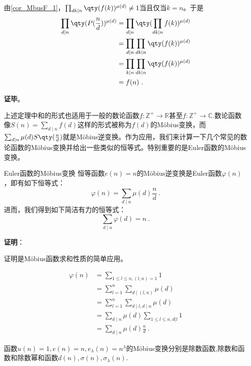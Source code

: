 由\autoref{cor_MbusF_1}，$\prod_{dk\mid n}\qty(f(k))^{\mu(d)}\neq 1$当且仅当$k=n$。于是
\begin{equation}
\begin{aligned}
\prod_{d\mid n}\qty(P(\frac{n}{d}))^{\mu(d)}&=\prod_{d\mid n}\qty(\prod_{dk\mid n}f(k))^{\mu(d)}\\
&=\prod_{d\mid n}\prod_{dk\mid n}\qty(f(k))^{\mu(d)}\\
&=\prod_{k\mid n}\prod_{dk\mid n}\qty(f(k))^{\mu(d)}\\
&=f(n)~.
\end{aligned}
\end{equation}

\textbf{证毕}。

上述定理中和的形式也适用于一般的数论函数$f:\mathbb{Z}^+\to\mathbb{R}$甚至$f:\mathbb{Z}^+\to\mathbb{C}$.数论函数像$S(n)=\sum_{d\mid n}f(d)$这样的形式被称为$f(d)$的Möbius变换，而$\sum_{d\mid n}\mu(d)S\qty(\frac{n}{d})$就是Möbius逆变换。作为应用，我们来计算一下几个常见的数论函数的Möbius变换并给出一些类似的恒等式。特别重要的是Euler函数的Möbius变换。

\begin{theorem}{Euler函数的Möbius变换}
恒等函数$e(n)=n$的Möbius逆变换是Euler函数$\varphi(n)$，即有如下恒等式：
\begin{equation}
\varphi(n) = \sum_{d\mid n}\mu(d)\frac{n}{d}~.
\end{equation}
进而，我们得到如下简洁有力的恒等式：
\begin{equation}
\sum_{d\mid n}\varphi(d) = n~.
\end{equation}
\end{theorem}

\textbf{证明}：

证明是Möbius函数求和性质的简单应用。

\begin{equation}
\begin{aligned}
\varphi(n)&=\sum_{1\leq l\leq n,(l,n)=1}1\\
&=\sum_{l=1}^n\sum_{d\mid(l,n)}\mu(d)\\
&=\sum_{l=1}^n\sum_{d\mid l,d\mid n}\mu(d)\\
&=\sum_{d\mid n}\mu(d)\sum_{1\leq l\leq n,d|l}1\\
&=\sum_{d\mid n}\mu(d)\frac{n}{d}~.
\end{aligned}
\end{equation}

\begin{theorem}{}
函数$u(n)=1,e(n)=n,e_\lambda(n)=n^\lambda$的Möbius变换分别是除数函数,除数和函数和除数幂和函数$d(n),\sigma(n),\sigma_\lambda(n)$.
\end{theorem}

